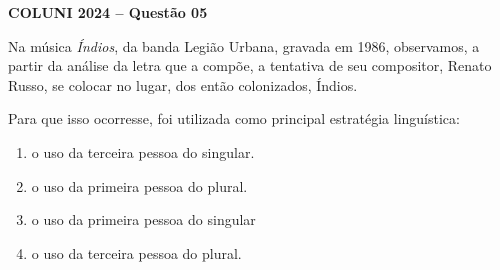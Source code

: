 \textbf{COLUNI 2024 -- Questão 05}\par\medskip Na música \textit{Índios}, da banda Legião Urbana, gravada em 1986, observamos, a partir da análise da letra que a compõe, a tentativa de seu compositor, Renato Russo, se colocar no lugar, dos então colonizados, Índios.

\par

Para que isso ocorresse, foi utilizada como principal estratégia linguística:\begin{enumerate}
\item o uso da terceira pessoa do singular.
\item o uso da primeira pessoa do plural.
\item o uso da primeira pessoa do singular
\item o uso da terceira pessoa do plural.\end{enumerate}
